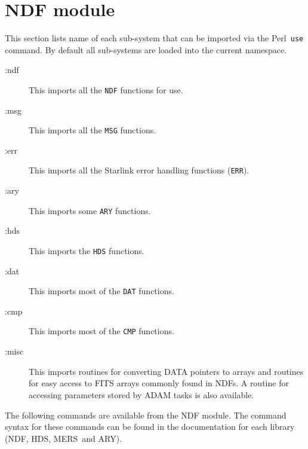 \documentclass[twoside,11pt]{article}
\newcommand{\ndf}{\xref{NDF}{sun33}{}}
\newcommand{\perl}{\xref{\textsf{Perl}}{sun193}{}}
\newcommand{\hds}{\xref{HDS}{sun92}{}}
\newcommand{\ary}{\xref{ARY}{sun11}{}}
\newcommand{\mers}{\xref{MERS}{sun104}{}}
\newcommand{\xref}[3]{#1}
\renewcommand{\_}{\texttt{\symbol{95}}}
\begin{document}
\section{NDF module\label{ndfapp}}

This section lists name of each sub-system that can be imported via the
\perl\ \texttt{use} command. By default all sub-systems are loaded into the
current namespace.

\begin{description}

\item[:ndf] \mbox{}

This imports all the \texttt{NDF\_} functions for use.

\item[:msg] \mbox{}

This imports all the \texttt{MSG\_} functions.

\item[:err] \mbox{}

This imports all the Starlink error handling functions (\texttt{ERR\_}).

\item[:ary] \mbox{}

This imports some \texttt{ARY\_} functions.

\item[:hds] \mbox{}

This imports the \texttt{HDS\_} functions.

\item[:dat] \mbox{}

This imports most of the \texttt{DAT\_} functions.

\item[:cmp] \mbox{}

This imports most of the \texttt{CMP\_} functions.

\item[:misc] \mbox{}

This imports routines for converting DATA pointers to arrays and routines for
easy access to FITS arrays commonly found in NDFs. A routine for accessing
parameters stored by ADAM tasks is also available.

\end{description}

The following commands are available from the NDF module.
The command syntax for these commands can be found in the documentation
for each library (\ndf, \hds, \mers\ and \ary).
\end{document}
